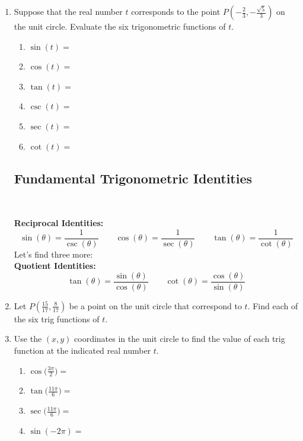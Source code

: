 \begin{enumerate}
\item Suppose that the real number $t$ corresponds to the point $P(-\frac{2}{3},-\frac{\sqrt{5}}{3})$ on the unit circle.  Evaluate the six trigonometric functions of $t$.
\begin{enumerate}
\item $\sin(t)=$\\[.5in]
\item $\cos(t)=$ \\[.5in]
\item $\tan(t)=$ \\[.5in]
\item $\csc(t)=$ \\[.5in]
\item $\sec(t)=$ \\[.5in]
\item $\cot(t)=$ \\[.5in]
\end{enumerate}

\subsection{Fundamental Trigonometric Identities} ~

\textbf{Reciprocal Identities:  }
$$\sin(\theta)=\frac{1}{\csc(\theta)} \quad \quad \cos(\theta)=\frac{1}{\sec(\theta)} \quad \quad \tan(\theta)=\frac{1}{\cot(\theta)}$$
Let's find three more:\\[.2in]

\textbf{Quotient Identities:  }
$$\tan(\theta)=\frac{\sin(\theta)}{\cos(\theta)} \quad \quad \cot(\theta)=\frac{\cos(\theta)}{\sin(\theta)}$$

\item Let $P(\frac{15}{17}, \frac{8}{17})$ be a point on the unit circle that correspond to $t$.  Find each of the six trig functions of $t$.\\[1.7in]

\item Use the $(x,y)$ coordinates in the unit circle to find the value of each trig function at the indicated real number $t$.\\

\begin{enumerate}
\item $\displaystyle \cos\Big(\frac{3\pi}{2}\Big)=$\\[.2in]
\item $\displaystyle \tan\Big(\frac{11\pi}{6}\Big)=$\\[.5in]
\item $\displaystyle \sec\Big(\frac{11\pi}{6}\Big)=$\\[.5in]
\item $\displaystyle \sin(-2\pi)=$\\[.2in]
\end{enumerate}


\end{enumerate}
